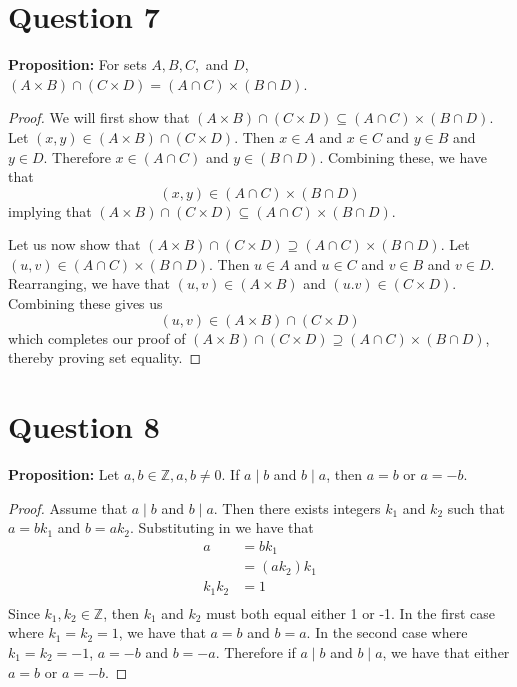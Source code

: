 \documentclass[11pt, oneside]{article}   	%
\begin{document}
\section*{Question 7}

\textbf{Proposition:} For sets $A, B, C,$ and $D$, $(A \times B) \cap (C \times D) = (A \cap C) \times (B \cap D)$.

\begin{proof}
We will first show that $(A \times B) \cap (C \times D) \subseteq (A \cap C) \times (B \cap D)$. Let $(x,y) \in (A \times B) \cap (C \times D)$. Then $x \in A$ and $x \in C$ and $y \in B$ and $y \in D$. Therefore $x \in (A \cap C)$ and $y \in (B \cap D)$. Combining these, we have that
$$(x,y) \in (A \cap C) \times (B \cap D)$$
implying that $(A \times B) \cap (C \times D) \subseteq (A \cap C) \times (B \cap D)$.

Let us now show that $(A \times B) \cap (C \times D) \supseteq (A \cap C) \times (B \cap D)$. Let $(u,v) \in (A \cap C) \times (B \cap D)$. Then $u \in A$ and $u \in C$ and $v \in B$ and $v \in D$. Rearranging, we have that $(u,v) \in (A \times B)$ and $(u.v) \in (C \times D)$. Combining these gives us
$$(u,v) \in (A \times B) \cap (C \times D)$$
which completes our proof of $(A \times B) \cap (C \times D) \supseteq (A \cap C) \times (B \cap D)$, thereby proving set equality.
\end{proof}


\section*{Question 8}

\textbf{Proposition:} Let $a, b \in \mathbb{Z}, a,b \neq 0$. If $a \mid b$ and $b \mid a$, then $a=b$ or $a=-b$.

\begin{proof}
Assume that $a \mid b$ and $b \mid a$. Then there exists integers $k_1$ and $k_2$ such that $a=bk_1$ and $b=ak_2$. Substituting in we have that
\begin{align*}
	a & = bk_1 \\
	& = (ak_2)k_1 \\
	k_1k_2 & = 1 \\
\end{align*}
Since $k_1, k_2 \in \mathbb{Z}$, then $k_1$ and $k_2$ must both equal either 1 or -1. In the first case where $k_1=k_2=1$, we have that $a=b$ and $b=a$. In the second case where $k_1 = k_2 = -1$, $a=-b$ and $b=-a$. Therefore if  $a \mid b$ and $b \mid a$, we have that either $a=b$ or $a=-b$.
\end{proof}
\end{document}
